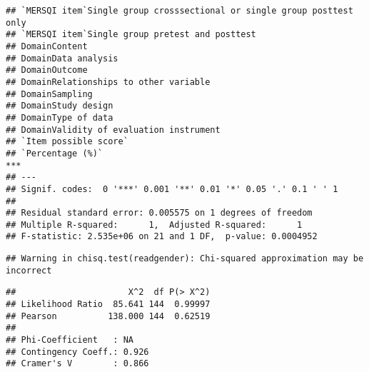 \documentclass[]{article}
\newenvironment{Shaded}{\begin{snugshade}}{\end{snugshade}}
\newcommand{\CommentTok}[1]{\textcolor[rgb]{0.56,0.35,0.01}{\textit{#1}}}
\newcommand{\DataTypeTok}[1]{\textcolor[rgb]{0.13,0.29,0.53}{#1}}
\newcommand{\KeywordTok}[1]{\textcolor[rgb]{0.13,0.29,0.53}{\textbf{#1}}}
\newcommand{\NormalTok}[1]{#1}
\newcommand{\OperatorTok}[1]{\textcolor[rgb]{0.81,0.36,0.00}{\textbf{#1}}}
\newcommand{\StringTok}[1]{\textcolor[rgb]{0.31,0.60,0.02}{#1}}
\begin{document}
\begin{verbatim}
## `MERSQI item`Single group crosssectional or single group posttest only       
## `MERSQI item`Single group pretest and posttest                               
## DomainContent                                                                
## DomainData analysis                                                          
## DomainOutcome                                                                
## DomainRelationships to other variable                                        
## DomainSampling                                                               
## DomainStudy design                                                           
## DomainType of data                                                           
## DomainValidity of evaluation instrument                                      
## `Item possible score`                                                        
## `Percentage (%)`                                                          ***
## ---
## Signif. codes:  0 '***' 0.001 '**' 0.01 '*' 0.05 '.' 0.1 ' ' 1
## 
## Residual standard error: 0.005575 on 1 degrees of freedom
## Multiple R-squared:      1,  Adjusted R-squared:      1 
## F-statistic: 2.535e+06 on 21 and 1 DF,  p-value: 0.0004952
\end{verbatim}

\begin{Shaded}
\end{Shaded}

\begin{verbatim}
## Warning in chisq.test(readgender): Chi-squared approximation may be incorrect
\end{verbatim}

\begin{verbatim}
##                      X^2  df P(> X^2)
## Likelihood Ratio  85.641 144  0.99997
## Pearson          138.000 144  0.62519
## 
## Phi-Coefficient   : NA 
## Contingency Coeff.: 0.926 
## Cramer's V        : 0.866
\end{verbatim}

\begin{Shaded}
\end{Shaded}
\end{document}
